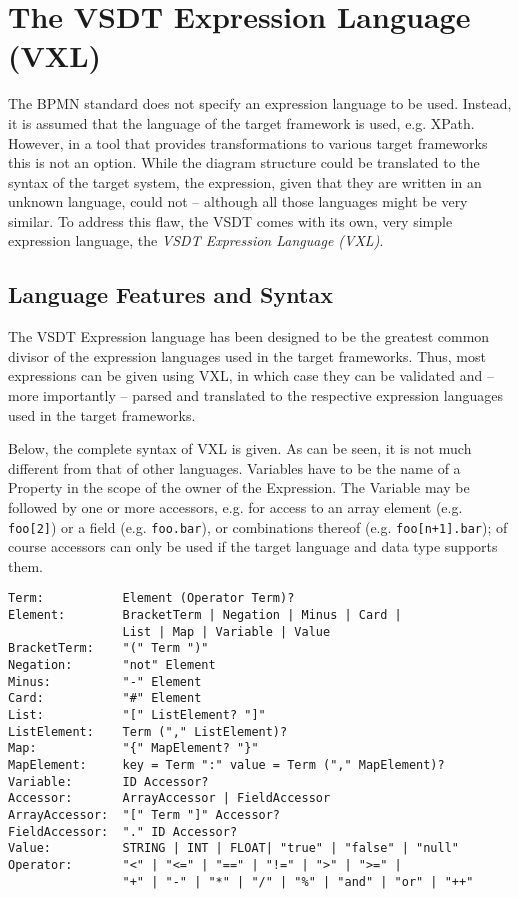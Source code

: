 \chapter{The VSDT Expression Language (VXL)}
\label{sec:vxl}

The BPMN standard does not specify an expression language to be used.  Instead,
it is assumed that the language of the target framework is used, e.g.  XPath.
However, in a tool that provides transformations to various target frameworks
this is not an option.  While the diagram structure could be translated to the
syntax of the target system, the expression, given that they are written in an
unknown language, could not -- although all those languages might be very similar.
To address this flaw, the VSDT comes with its own, very simple expression language,
the \emph{VSDT Expression Language (VXL)}.



\section{Language Features and Syntax}

The VSDT Expression language has been designed to be the greatest common divisor
of the expression languages used in the target frameworks.  Thus, most expressions
can be given using VXL, in which case they can be validated and -- more importantly
-- parsed and translated to the respective expression languages used in the target
frameworks.

Below, the complete syntax of VXL is given.  As can be seen, it is not much
different from that of other languages.  Variables have to be the name of a
Property in the scope of the owner of the Expression.  The Variable may be followed
by one or more accessors, e.g. for access to an array element (e.g. \verb_foo[2]_)
or a field (e.g. \verb_foo.bar_), or combinations thereof (e.g. \verb_foo[n+1].bar_);
of course accessors can only be used if the target language and data type supports
them.

\begin{verbatim}
Term:           Element (Operator Term)?
Element:        BracketTerm | Negation | Minus | Card |
                List | Map | Variable | Value
BracketTerm:    "(" Term ")"
Negation:       "not" Element
Minus:          "-" Element
Card:           "#" Element
List:           "[" ListElement? "]"
ListElement:    Term ("," ListElement)?
Map:            "{" MapElement? "}"
MapElement:     key = Term ":" value = Term ("," MapElement)?
Variable:       ID Accessor?
Accessor:       ArrayAccessor | FieldAccessor
ArrayAccessor:  "[" Term "]" Accessor?
FieldAccessor:  "." ID Accessor?
Value:          STRING | INT | FLOAT| "true" | "false" | "null"
Operator:       "<" | "<=" | "==" | "!=" | ">" | ">=" | 
                "+" | "-" | "*" | "/" | "%" | "and" | "or" | "++"
\end{verbatim}


